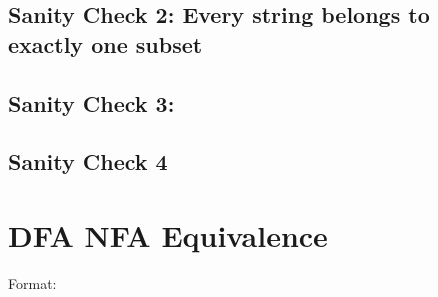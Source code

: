 \documentclass{article}
\begin{document}
\subsection*{Sanity Check 2: Every string belongs to \textbf{exactly one} subset}
\subsection*{Sanity Check 3: }
\subsection*{Sanity Check 4}

\newpage
\section*{DFA NFA Equivalence}
Format:
\end{document}
